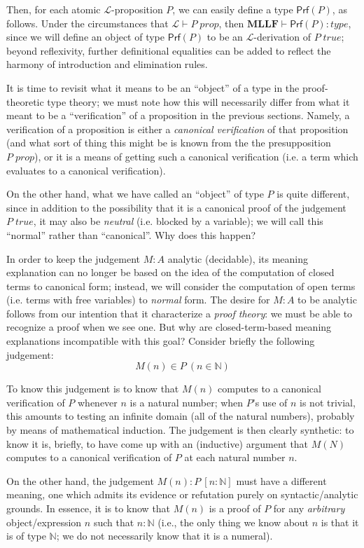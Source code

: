 \documentclass{amsart}
\theoremstyle{definition}
\theoremstyle{remark}
\numberwithin{equation}{section}
\newcommand\isprop[1]{\ensuremath{#1\;\mathit{prop}}}
\newcommand\istrue[1]{\ensuremath{#1\;\mathit{true}}}
\newcommand\hyp[2]{\ensuremath{#1\ (#2)}}
\newcommand\naturals{\ensuremath{\mathbb{N}}}
\newcommand\lfhyp[2]{\ensuremath{#1\ [#2]}}
\newcommand\prf[1]{\ensuremath{\mathsf{Prf}(#1)}}
\newcommand\MLLF{\textbf{MLLF}}
\newcommand\type[1]{\ensuremath{#1:\mathit{type}}}
\begin{document}
Then, for each atomic $\mathcal{L}$-proposition $P$, we can easily define a
type \prf{P}, as follows. Under the circumstances that
$\mathcal{L}\vdash\isprop{P}$, then $\MLLF\vdash\type{\prf{P}}$, since we will
define an object of type \prf{P} to be an $\mathcal{L}$-derivation of
\istrue{P}; beyond reflexivity, further definitional equalities can be added to
reflect the harmony of introduction and elimination rules.

It is time to revisit what it means to be an ``object'' of a type in the
proof-theoretic type theory; we must note how this will necessarily differ from
what it meant to be a ``verification'' of a proposition in the previous
sections. Namely, a verification of a proposition is either a \emph{canonical
verification} of that proposition (and what sort of thing this might be is
known from the the presupposition \isprop{P}), or it is a means of getting such
a canonical verification (i.e. a term which evaluates to a canonical
verification).

On the other hand, what we have called an ``object'' of type $P$ is quite
different, since in addition to the possibility that it is a canonical proof of
the judgement \istrue{P}, it may also be \emph{neutral} (i.e. blocked by a
variable); we will call this ``normal'' rather than ``canonical''. Why does
this happen?

In order to keep the judgement $M:A$ analytic (decidable), its meaning
explanation can no longer be based on the idea of the computation of closed
terms to canonical form; instead, we will consider the computation of open
terms (i.e. terms with free variables) to \emph{normal} form. The desire for
$M:A$ to be analytic follows from our intention that it characterize a
\emph{proof theory}: we must be able to recognize a proof when we see one. But
why are closed-term-based meaning explanations incompatible with this goal?
Consider briefly the following judgement:
\[
  \hyp{M(n) \in P}{n\in\naturals}
\]

To know this judgement is to know that $M(n)$ computes to a canonical
verification of $P$ whenever $n$ is a natural number; when $P$'s use of $n$ is
not trivial, this amounts to testing an infinite domain (all of the natural
numbers), probably by means of mathematical induction. The judgement is then
clearly synthetic: to know it is, briefly, to have come up with an (inductive)
argument that $M(N)$ computes to a canonical verification of $P$ at each
natural number $n$.

On the other hand, the judgement \lfhyp{M(n):P}{n:\naturals} must have a
different meaning, one which admits its evidence or refutation purely on
syntactic/analytic grounds. In essence, it is to know that $M(n)$ is a proof of
$P$ for any \emph{arbitrary} object/expression $n$ such that $n:\naturals$
(i.e., the only thing we know about $n$ is that it is of type $\naturals$; we
do not necessarily know that it is a numeral).
\end{document}
